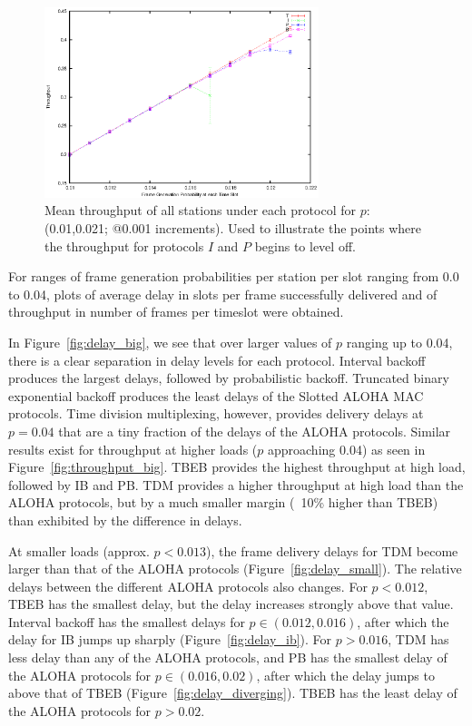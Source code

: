 \documentclass[twocolumn]{article}
\begin{document}
\begin{figure}
    \centering \includegraphics[width=8cm]{plots/tpbi_throughput.eps}
    \caption{\footnotesize Mean throughput of all stations under each protocol
    for $p$:(0.01,0.021; @0.001 increments). Used to illustrate the points where
    the throughput for protocols $I$ and $P$ begins to level off.}
    \label{fig:throughput_diverging}
\end{figure}


For ranges of frame generation probabilities per station per slot ranging
from 0.0 to 0.04, plots of average delay in slots per frame successfully delivered and
of throughput in number of frames per timeslot were obtained. 

In Figure~\ref{fig:delay_big}, we see that over larger values of $p$ ranging up to
0.04, there is a clear separation in delay levels for each protocol. Interval backoff
produces the largest delays, followed by probabilistic backoff. Truncated binary exponential
backoff produces the least delays of the Slotted ALOHA MAC protocols. Time division multiplexing,
however, provides delivery delays at $p=0.04$ that are a tiny fraction of the delays of the 
ALOHA protocols. Similar results exist for throughput at higher loads ($p$ approaching 0.04) as 
seen in Figure~\ref{fig:throughput_big}. TBEB provides the highest throughput at high load,
followed by IB and PB. TDM provides a higher throughput at high load than the ALOHA protocols,
but by a much smaller margin (~10\% higher than TBEB) than exhibited by the difference in
delays.

At smaller loads (approx. $p<0.013$), the frame delivery delays for TDM become
larger than that of the ALOHA protocols (Figure~\ref{fig:delay_small}). The relative delays 
between the different ALOHA protocols also changes. For $p<0.012$, TBEB has the smallest delay,
but the delay increases strongly above that value. Interval backoff has the smallest delays
for 
$p \in (0.012, 0.016)$, after which the delay for IB jumps up sharply (Figure~\ref{fig:delay_ib}).
For $p > 0.016$, TDM has less delay than any of the ALOHA protocols, and PB has the smallest 
delay of the ALOHA protocols for $p \in (0.016, 0.02)$, after which the delay jumps to above
that of TBEB (Figure~\ref{fig:delay_diverging}). TBEB has the least delay of the ALOHA protocols
for $p > 0.02$.
\end{document}
